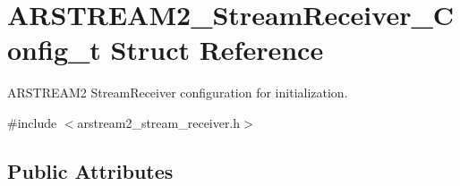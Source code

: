 \hypertarget{struct_a_r_s_t_r_e_a_m2___stream_receiver___config__t}{}\section{A\+R\+S\+T\+R\+E\+A\+M2\+\_\+\+Stream\+Receiver\+\_\+\+Config\+\_\+t Struct Reference}
\label{struct_a_r_s_t_r_e_a_m2___stream_receiver___config__t}


A\+R\+S\+T\+R\+E\+A\+M2 Stream\+Receiver configuration for initialization.  




{\ttfamily \#include $<$arstream2\+\_\+stream\+\_\+receiver.\+h$>$}

\subsection*{Public Attributes}
